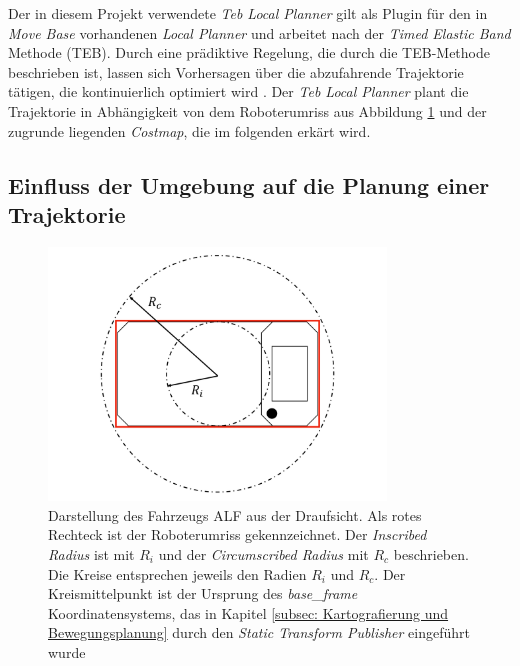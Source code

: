 		    	Der in diesem Projekt verwendete \textit{Teb Local Planner} gilt als Plugin für den in \textit{Move Base} vorhandenen \textit{Local Planner} und arbeitet nach der \textit{Timed Elastic Band} Methode (TEB). Durch eine prädiktive Regelung, die durch die TEB-Methode beschrieben ist, lassen sich Vorhersagen über die abzufahrende Trajektorie tätigen, die kontinuierlich optimiert wird \cite{tebmethode}. 
		    	Der \textit{Teb Local Planner} plant die Trajektorie in Abhängigkeit von dem Roboterumriss aus Abbildung \ref{fig: footprint} und der zugrunde liegenden \textit{Costmap}, die im folgenden erkärt wird. \cite{teblp}
		    	
		   
		   \subsection{Einfluss der Umgebung auf die Planung einer Trajektorie}
		   \label{subsec: Einfluss der Umgebung auf die Planung einer Trajektorie}	
		    \begin{figure}[H]
		    	\centering
		    	\includegraphics[width=0.8\textwidth]{Bilder/footprint.png}
		    	\caption{Darstellung des Fahrzeugs ALF aus der Draufsicht. Als rotes Rechteck ist der Roboterumriss gekennzeichnet. Der \textit{Inscribed Radius} ist mit $R_i$ und der \textit{Circumscribed Radius} mit $R_c$ beschrieben. Die Kreise entsprechen jeweils den Radien $R_i$ und $R_c$. Der Kreismittelpunkt ist der Ursprung des \textit{base\_frame} Koordinatensystems, das in Kapitel \ref{subsec: Kartografierung und Bewegungsplanung} durch den \textit{Static Transform Publisher} eingeführt wurde}
		    	\label{fig: footprint}
		  	  \end{figure}
		    
